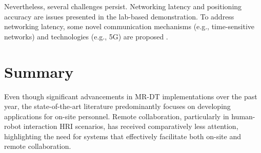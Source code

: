 \begin{enumerate}
    Nevertheless, several challenges persist. Networking latency and positioning accuracy are issues presented in the lab-based demonstration. To address networking latency, some novel communication mechanisms (e.g., time-sensitive networks) and technologies (e.g., 5G) are proposed \cite{LI2022102321}. 




\end{enumerate}

\section{Summary}

Even though significant advancements in \ac{MR}-\ac{DT} implementations over the past year, the state-of-the-art literature predominantly focuses on developing applications for on-site personnel. Remote collaboration, particularly in human-robot interaction \ac{HRI} scenarios, has received comparatively less attention, highlighting the need for systems that effectively facilitate both on-site and remote collaboration.

